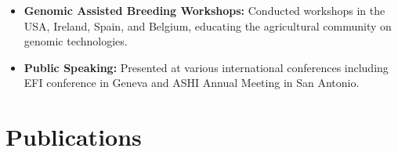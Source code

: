 \documentclass[11pt,a4paper,]{moderncv}
\providecommand{\tightlist}{%
	\setlength{\itemsep}{0pt}\setlength{\parskip}{0pt}}
\begin{document}
\begin{itemize}
\tightlist
\item
  \textbf{Genomic Assisted Breeding Workshops:} Conducted workshops in
  the USA, Ireland, Spain, and Belgium, educating the agricultural
  community on genomic technologies.
\item
  \textbf{Public Speaking:} Presented at various international
  conferences including EFI conference in Geneva and ASHI Annual Meeting
  in San Antonio.
\end{itemize}

\section{Publications}\label{publications-1}

\label{refs-fc9fcad9798ae22e92c54d59a6d1bc3c}
\end{document}

